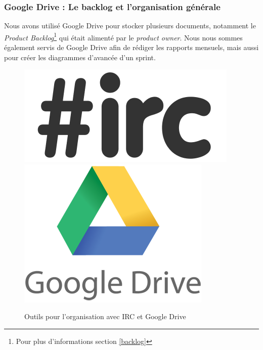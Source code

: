 \subsubsection{Google Drive : Le backlog et l'organisation générale}
Nous avons utilisé Google Drive pour stocker plusieurs documents, notamment le \textit{Product Backlog}\footnote{Pour plus d'informations
section \ref{backlog}} qui était alimenté par le \textit{product owner}.  Nous nous sommes également servis de Google Drive afin de rédiger les
rapports mensuels, mais aussi pour créer les diagrammes d'avancée d'un sprint. 

\begin{figure}[H]
	\centering
	\includegraphics[height=0.12\textwidth]{../beamer/logos/irc.png}~~
	\includegraphics[height=0.12\textwidth]{../beamer/logos/drive.png}
\caption{Outils pour l'organisation avec IRC et Google Drive}
\end{figure}


